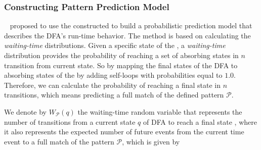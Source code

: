 \begin{itemize}[noitemsep]
 
\end{itemize}




\subsubsection*{Constructing Pattern Prediction Model}
\label{sec:pmc_prediction}

~\citet{alevizos2017event} proposed to use the constructed \pmcmr to build a probabilistic prediction model that describes the DFA's run-time behavior. The method is based on calculating the \textit{waiting-time} distributions. Given a specific state of the \pmcmr, a \textit{waiting-time} distribution provides the probability of reaching a set of absorbing states in $n$ transition from current state. So by mapping the final states of the DFA to absorbing states of the \pmcmr by adding self-loops with probabilities equal to $1.0$. Therefore, we can calculate the probability of reaching a final state in $n$ transitions,  which means predicting a full match of the defined pattern $\mathcal{P}$.

\par We denote by $W_{\mathcal{P}}(q)$ the waiting-time random variable that represents the
number of transitions from a current state $q$ of DFA to reach a final state \cite{alevizos2017event}, where it also represents the expected number of future events from the current time event to  a full match of the pattern $\mathcal{P}$, which is given by 

